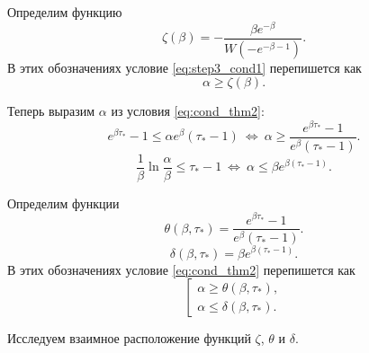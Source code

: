 Определим функцию
\begin{equation}
\label{eq:step_3_zeta_func}
\zeta(\beta) = - \dfrac{\beta e^{-\beta}}{W(-e^{-\beta - 1})}.
\end{equation}
%
В этих обозначениях условие \eqref{eq:step3_cond1} перепишется как
%
\begin{equation}
\label{eq:step_3_cond_zeta}
\alpha \geqslant \zeta(\beta).
\end{equation}

Теперь выразим $\alpha$ из условия \eqref{eq:cond_thm2}:
\begin{equation}
\label{eq:step3_cond2_expanded_1}
e^{\beta \tau_*}-1\leqslant\alpha e^\beta(\tau_*-1)\ \Leftrightarrow\ \alpha \geqslant \dfrac{e^{\beta \tau_*}-1}{e^\beta(\tau_*-1)}.
\end{equation}
\begin{equation}
\label{eq:step3_cond2_expanded_2}
\frac{1}{\beta}\ln\frac{\alpha}{\beta}\leqslant\tau_*-1\ \Leftrightarrow\ \alpha \leqslant \beta e^{\beta (\tau_* - 1)}.
\end{equation}

Определим функции
\begin{equation}
\label{eq:step_3_theta_func}
\theta(\beta, \tau_*) = \dfrac{e^{\beta \tau_*}-1}{e^\beta(\tau_*-1)}.
\end{equation}
%
\begin{equation}
\label{eq:step_3_psi_func}
\delta(\beta, \tau_*) = \beta e^{\beta (\tau_* - 1)}.
\end{equation}
%
В этих обозначениях условие \eqref{eq:cond_thm2} перепишется как
%
\begin{equation}
\label{eq:step_3_cond_2}
\left[
\begin{array}{ll}
	\alpha \geqslant \theta(\beta, \tau_*),\\
	\alpha \leqslant \delta(\beta, \tau_*).
\end{array}
\right.
\end{equation}

Исследуем взаимное расположение функций $\zeta$, $\theta$ и $\delta$.

